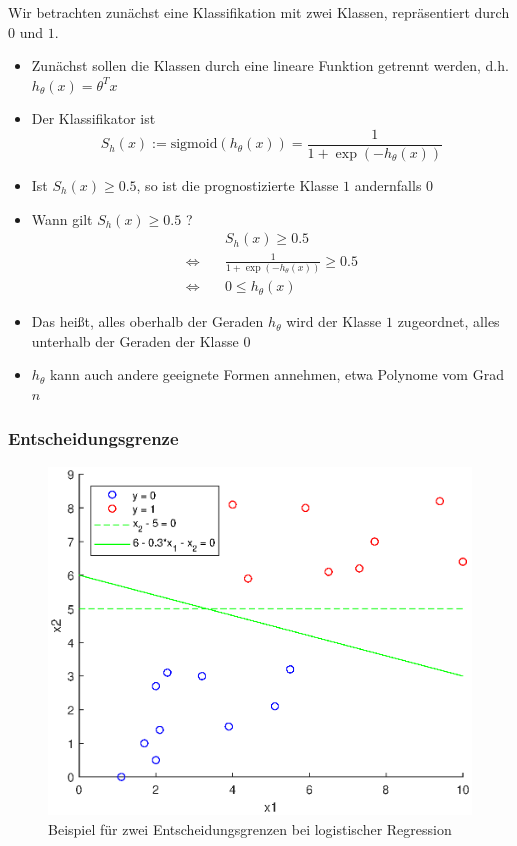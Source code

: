 \begin{frame}
Wir betrachten zunächst eine Klassifikation mit zwei Klassen, repräsentiert durch $0$ und $1$.
\begin{itemize}
\item Zunächst sollen die Klassen durch eine lineare Funktion getrennt werden, d.h. $h_\theta(x) = \theta^T x$
\item Der Klassifikator ist \[
S_h(x):=\text{sigmoid}(h_\theta(x)) = \frac{1}{1+\exp(-h_\theta(x))} \]
\item Ist $S_h(x)\geq 0.5$, so ist die prognostizierte Klasse $1$ andernfalls $0$
\item Wann gilt $S_h(x) \geq 0.5$ ?
\begin{align*}
&S_h(x) \geq 0.5\\
\Leftrightarrow\quad &\frac{1}{1+\exp(-h_\theta(x))} \geq 0.5\\
\Leftrightarrow\quad & 0\leq h_\theta(x)
\end{align*}
\item Das heißt, alles oberhalb der Geraden $h_\theta$ wird der Klasse $1$ zugeordnet, alles unterhalb der Geraden der Klasse $0$
\item $h_\theta$ kann auch andere geeignete Formen annehmen, etwa Polynome vom Grad $n$
\end{itemize}
\end{frame}
\begin{frame}
\frametitle{Entscheidungsgrenze}
\begin{figure}[hbtp]
\centering
\includegraphics[scale=0.5]{images/plot_logreg.eps}
\caption{Beispiel für zwei Entscheidungsgrenzen bei logistischer Regression}
\end{figure}

\end{frame}

